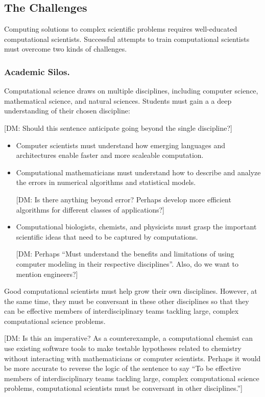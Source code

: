 \documentclass[11pt]{NSFamsart}
\begin{document}
\subsection*{The Challenges}
Computing solutions to complex scientific problems requires well-educated computational scientists.  Successful attempts to train computational scientists must overcome two kinds of challenges.

\subsubsection*{Academic Silos.} Computational science draws on multiple disciplines, including computer science, mathematical science, and natural sciences.  Students must gain a a deep understanding of their chosen discipline:

{\color{green}[DM: Should this sentence anticipate going beyond the single discipline?]}

\begin{itemize}
\item Computer scientists must understand how emerging languages and architectures enable faster and more scaleable computation.  

\item Computational mathematicians must understand how to describe and analyze the errors in numerical algorithms and statistical models.

{\color{green}[DM: Is there anything beyond error? Perhaps develop more efficient algorithms for different classes of applications?]}

\item Computational biologists, chemists, and physicists must grasp the important scientific ideas that need to be captured by computations.  

{\color{green}[DM: Perhaps ``Must understand the benefits and limitations of using computer modeling in their respective disciplines''. Also, do we want to mention engineers?]}

\end{itemize}
Good computational scientists must help grow their own disciplines.  However, at the same time, they must be conversant in these other disciplines so that they can be effective members of  interdisciplinary teams tackling large, complex computational science problems.

{\color{green}[DM: Is this an imperative? As a counterexample, a computational chemist can use existing software tools to make testable hypotheses related to chemistry without interacting with mathematicians or computer scientists. Perhaps it would be more accurate to reverse the logic of the sentence to say ``To be effective members of interdisciplinary teams tackling large, complex computational science problems, computational scientists must be conversant in other disciplines.'']}
\end{document}
